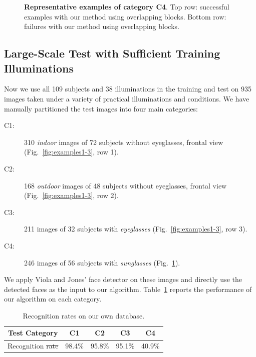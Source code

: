 \documentclass[12pt,journal,draftcls,letterpaper,onecolumn]{IEEEtran}
\providecommand{\DIFadd}[1]{{\protect\color{blue}\uwave{#1}}} %
\providecommand{\DIFdel}[1]{{\protect\color{red}\sout{#1}}}                      %
\providecommand{\DIFaddFL}[1]{\DIFadd{#1}} %
\providecommand{\DIFdelFL}[1]{\DIFdel{#1}} %
\providecommand{\DIFaddbeginFL}{} %
\providecommand{\DIFaddendFL}{} %
\providecommand{\DIFdelbeginFL}{} %
\providecommand{\DIFdelendFL}{} %
\begin{document}
\begin{figure}[t]
 \caption{{\bf Representative examples of category C4}. Top row: successful examples with our method using overlapping blocks. Bottom row: failures with our method using overlapping blocks.}\label{fig:examples4}
\DIFdelbeginFL %
\DIFdelendFL \DIFaddbeginFL \vspace{-.15in}
\DIFaddendFL \end{figure}

\subsection{Large-Scale Test with Sufficient Training
Illuminations} Now we use all 109 subjects and 38 illuminations
in the training and test on 935 images taken under a variety of
practical illuminations and conditions. We have manually partitioned the test images into four main
categories:
\begin{description}
\item[C1:] 310 \emph{indoor} images of 72 subjects without
    eyeglasses, frontal view
    (Fig.~\ref{fig:examples1-3}, row 1).
\item[C2:] 168 \emph{outdoor} images of 48 subjects without
    eyeglasses, frontal view
    (Fig.~\ref{fig:examples1-3}, row 2).
\item[C3:] 211 images of 32 subjects with \emph{eyeglasses}
    (Fig.~\ref{fig:examples1-3}, row 3).
\item[C4:] 246 images of 56 subjects with \emph{sunglasses}
    (Fig.~\ref{fig:examples4}).
\end{description}
We apply Viola and Jones' face detector on these images and
directly use the detected faces as the input to our algorithm.
Table~\ref{tab:UIUC-recognition} reports the performance of our
algorithm on each category.
\begin{table}	
\centering \caption{Recognition rates on our own database.}
\begin{tabular}{|c|c|c|c|c| }
\hline
Test Category & C1 & C2 & C3 & C4  \\
\hline
\hline
Recognition \DIFdelbeginFL \DIFdelFL{rate }\DIFdelendFL \DIFaddbeginFL \DIFaddFL{Rate }\DIFaddendFL & 98.4\% & 95.8\% & 95.1\% & 40.9\% \\
\hline
\end{tabular}
\label{tab:UIUC-recognition}
\vspace{-.25in}
\end{table}
\end{document}

